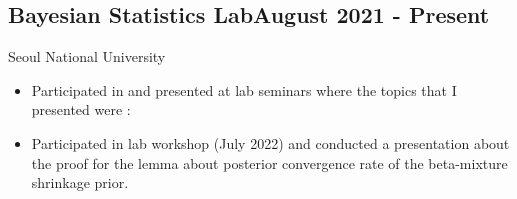 \documentclass[a4paper,12pt]{article}
\begin{document}


\vspace*{10pt}
\subsection{{Bayesian Statistics Lab}\hfill August 2021 - Present}

\vspace*{2pt}
Seoul National University
\begin{itemize}
    \item Participated in and presented at lab seminars where the topics that I presented were :
    \item Participated in lab workshop (July 2022) and conducted a presentation about the proof for the lemma about posterior convergence rate of the beta-mixture shrinkage prior. 
\end{itemize}
\end{document}
